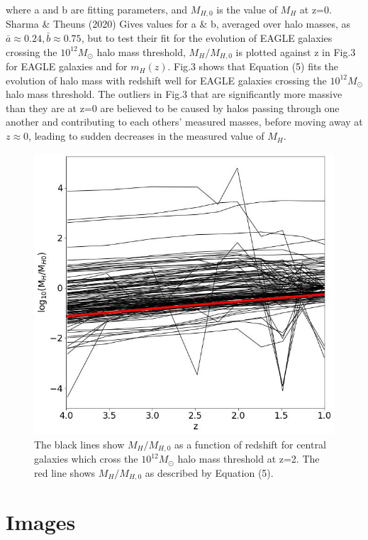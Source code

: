 \documentclass[12pt, twocolumn]{revtex4}    %
\begin{document}
\noindent where a and b are fitting parameters, and $M_{H,0}$ is the value of $M_H$ at z=0. Sharma \& Theuns (2020) Gives values for a \& b, averaged over halo masses, as $\bar a \approx 0.24, \bar b \approx 0.75$, but to test their fit for the evolution of EAGLE galaxies crossing the $10^{12}M_\odot$ halo mass threshold, $M_H/M_{H,0}$ is plotted against z in Fig.3 for EAGLE galaxies and for $m_H(z)$. Fig.3 shows that Equation (5) fits the evolution of halo mass with redshift well for EAGLE galaxies crossing the $10^{12}M_\odot$ halo mass threshold. The outliers in Fig.3 that are significantly more massive than they are at z=0 are believed to be caused by halos passing through one another and contributing to each others' measured masses, before moving away at $z\approx0$, leading to  sudden decreases in the measured value of $M_H$.

\onecolumngrid


\begin{figure}[H]
\centering
\includegraphics[width=\linewidth]{Plot_5.jpeg}
\caption{The black lines show $M_H/M_{H,0}$ as a function of redshift for central galaxies which cross the $10^{12}M_\odot$ halo mass threshold at z=2. The red line shows $M_H/M_{H,0}$ as described by Equation (5).}
\label{fig:3}
\end{figure}
\twocolumngrid


\section{Images}
\end{document}
